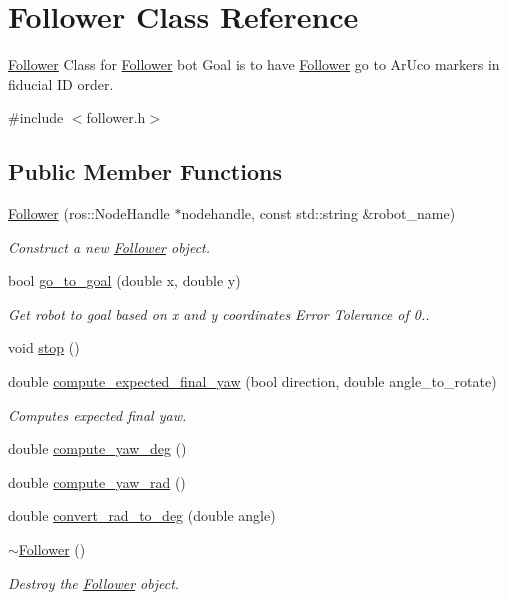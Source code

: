 \hypertarget{class_follower}{}\section{Follower Class Reference}
\label{class_follower}


\hyperlink{class_follower}{Follower} Class for \hyperlink{class_follower}{Follower} bot Goal is to have \hyperlink{class_follower}{Follower} go to Ar\+Uco markers in fiducial ID order.  




{\ttfamily \#include $<$follower.\+h$>$}

\subsection*{Public Member Functions}
\begin{DoxyCompactItemize}
\item 
\hyperlink{class_follower_a6870e654b7cc901944ead12870a6b107}{Follower} (ros\+::\+Node\+Handle $\ast$nodehandle, const std\+::string \&robot\+\_\+name)
\begin{DoxyCompactList}\small\item\em Construct a new \hyperlink{class_follower}{Follower} object. \end{DoxyCompactList}\item 
bool \hyperlink{class_follower_a08ab05cb32f0e6653939163dd22f344a}{go\+\_\+to\+\_\+goal} (double x, double y)
\begin{DoxyCompactList}\small\item\em Get robot to goal based on x and y coordinates Error Tolerance of 0.. \end{DoxyCompactList}\item 
void \hyperlink{class_follower_a84c17a75630c27bea4f401c8ab8e45b2}{stop} ()
\item 
double \hyperlink{class_follower_a5573bec72ce4aed99706213154849b65}{compute\+\_\+expected\+\_\+final\+\_\+yaw} (bool direction, double angle\+\_\+to\+\_\+rotate)
\begin{DoxyCompactList}\small\item\em Computes expected final yaw. \end{DoxyCompactList}\item 
double \hyperlink{class_follower_ac988cad87474cb64ef3be7fe197d90a7}{compute\+\_\+yaw\+\_\+deg} ()
\item 
double \hyperlink{class_follower_abde593631e6549062d77fb2169a17c66}{compute\+\_\+yaw\+\_\+rad} ()
\item 
double \hyperlink{class_follower_a670f07466502e1020514d6ba6b928553}{convert\+\_\+rad\+\_\+to\+\_\+deg} (double angle)
\item 
\hyperlink{class_follower_a1dd55289af5ded7a57a2874c5477c33d}{$\sim$\+Follower} ()
\begin{DoxyCompactList}\small\item\em Destroy the \hyperlink{class_follower}{Follower} object. \end{DoxyCompactList}\end{DoxyCompactItemize}
